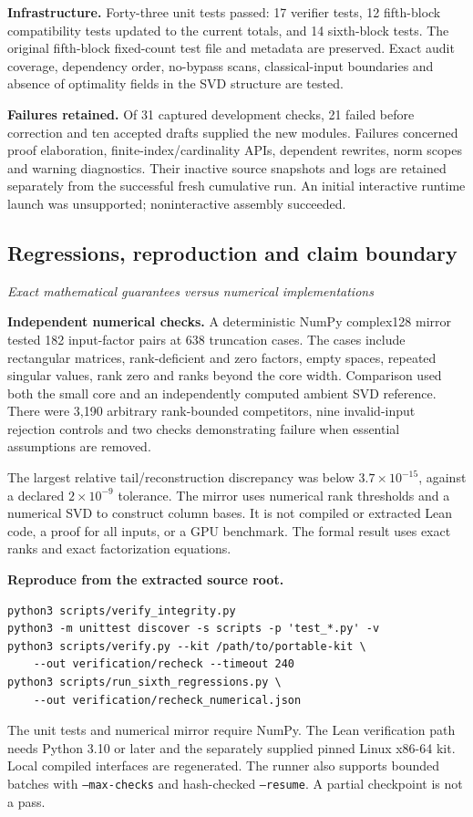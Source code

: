 \textbf{Infrastructure.} Forty-three unit tests passed: 17 verifier tests, 12 fifth-block compatibility tests updated to the current totals, and 14 sixth-block tests. The original fifth-block fixed-count test file and metadata are preserved. Exact audit coverage, dependency order, no-bypass scans, classical-input boundaries and absence of optimality fields in the SVD structure are tested.

\textbf{Failures retained.} Of 31 captured development checks, 21 failed before correction and ten accepted drafts supplied the new modules. Failures concerned proof elaboration, finite-index/cardinality APIs, dependent rewrites, norm scopes and warning diagnostics. Their inactive source snapshots and logs are retained separately from the successful fresh cumulative run. An initial interactive runtime launch was unsupported; noninteractive assembly succeeded.



\subsection{Regressions, reproduction and claim boundary}\label{supp6:subsection:007}\textit{Exact mathematical guarantees versus numerical implementations}\par
\textbf{Independent numerical checks.} A deterministic NumPy complex128 mirror tested 182 input-factor pairs at 638 truncation cases. The cases include rectangular matrices, rank-deficient and zero factors, empty spaces, repeated singular values, rank zero and ranks beyond the core width. Comparison used both the small core and an independently computed ambient SVD reference. There were 3,190 arbitrary rank-bounded competitors, nine invalid-input rejection controls and two checks demonstrating failure when essential assumptions are removed.

The largest relative tail/reconstruction discrepancy was below $3.7\times10^{-15}$, against a declared $2\times10^{-9}$ tolerance. The mirror uses numerical rank thresholds and a numerical SVD to construct column bases. It is not compiled or extracted Lean code, a proof for all inputs, or a GPU benchmark. The formal result uses exact ranks and exact factorization equations.

\textbf{Reproduce from the extracted source root.}
\begin{verbatim}
python3 scripts/verify_integrity.py
python3 -m unittest discover -s scripts -p 'test_*.py' -v
python3 scripts/verify.py --kit /path/to/portable-kit \
    --out verification/recheck --timeout 240
python3 scripts/run_sixth_regressions.py \
    --out verification/recheck_numerical.json
\end{verbatim}
The unit tests and numerical mirror require NumPy. The Lean verification path needs Python 3.10 or later and the separately supplied pinned Linux x86-64 kit. Local compiled interfaces are regenerated. The runner also supports bounded batches with \texttt{--max-checks} and hash-checked \texttt{--resume}. A partial checkpoint is not a pass.

